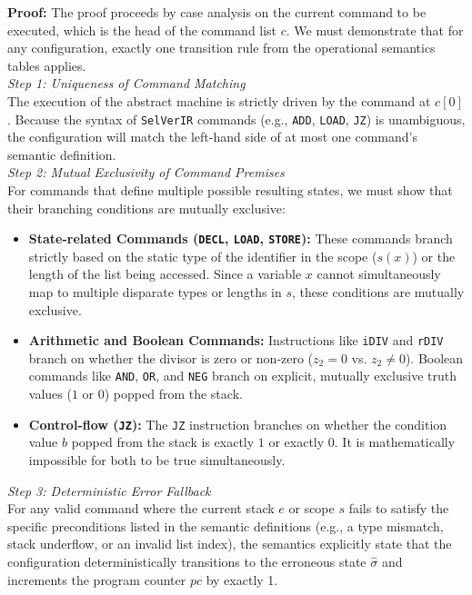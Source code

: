 \documentclass{article}
\begin{document}
\textbf{Proof:} The proof proceeds by case analysis on the current command to be executed, which is the head of the command list $c$. We must demonstrate that for any configuration, exactly one transition rule from the operational semantics tables applies. \\

\textit{Step 1: Uniqueness of Command Matching} \\
The execution of the abstract machine is strictly driven by the command at $c[0]$. Because the syntax of \texttt{SelVerIR} commands (e.g., \texttt{ADD}, \texttt{LOAD}, \texttt{JZ}) is unambiguous, the configuration will match the left-hand side of at most one command's semantic definition. \\

\textit{Step 2: Mutual Exclusivity of Command Premises} \\
For commands that define multiple possible resulting states, we must show that their branching conditions are mutually exclusive:
\begin{itemize}
    \item \textbf{State-related Commands (\texttt{DECL}, \texttt{LOAD}, \texttt{STORE}):} These commands branch strictly based on the static type of the identifier in the scope ($s(x)$) or the length of the list being accessed. Since a variable $x$ cannot simultaneously map to multiple disparate types or lengths in $s$, these conditions are mutually exclusive.
    \item \textbf{Arithmetic and Boolean Commands:} Instructions like \texttt{iDIV} and \texttt{rDIV} branch on whether the divisor is zero or non-zero ($z_2 = 0$ vs. $z_2 \neq 0$). Boolean commands like \texttt{AND}, \texttt{OR}, and \texttt{NEG} branch on explicit, mutually exclusive truth values ($1$ or $0$) popped from the stack.
    \item \textbf{Control-flow (\texttt{JZ}):} The \texttt{JZ} instruction branches on whether the condition value $b$ popped from the stack is exactly $1$ or exactly $0$. It is mathematically impossible for both to be true simultaneously.
\end{itemize}

\textit{Step 3: Deterministic Error Fallback} \\
For any valid command where the current stack $e$ or scope $s$ fails to satisfy the specific preconditions listed in the semantic definitions (e.g., a type mismatch, stack underflow, or an invalid list index), the semantics explicitly state that the configuration deterministically transitions to the erroneous state $\hat{\sigma}$ and increments the program counter $pc$ by exactly 1. \\
\end{document}
